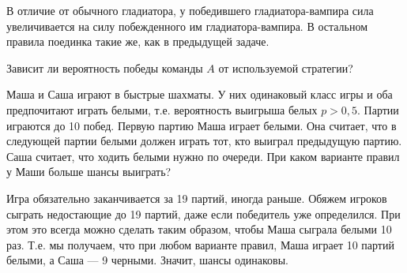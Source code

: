 \begin{problem}\par
\begin{source} \cite{winkler:gpdp} \end{source}
В отличие от обычного гладиатора, у победившего гладиатора-вампира сила увеличивается на силу побежденного им гладиатора-вампира. В остальном правила поединка такие же, как в предыдущей задаче.\par
Зависит ли вероятность победы команды  $A$  от используемой стратегии?\par



\begin{sol}

\end{sol}
\end{problem}





\begin{problem}\par

Маша и Саша играют в быстрые шахматы. У них одинаковый класс игры и оба предпочитают играть белыми, т.е. вероятность выигрыша белых  $p>0,5$. Партии играются до 10 побед. Первую партию Маша играет белыми. Она считает, что в следующей партии белыми должен играть тот, кто выиграл предыдущую партию. Саша считает, что ходить белыми нужно по очереди. При каком варианте правил у Маши больше шансы выиграть?\par
\begin{sol}
Игра обязательно заканчивается за 19 партий, иногда раньше. Обяжем игроков сыграть недостающие до 19 партий, даже если победитель уже определился. При этом это всегда можно сделать таким образом, чтобы Маша сыграла белыми 10 раз. Т.е. мы получаем, что при любом варианте правил, Маша играет 10 партий белыми, а Саша --- 9 черными. Значит, шансы одинаковы.
\end{sol}
\end{problem}



